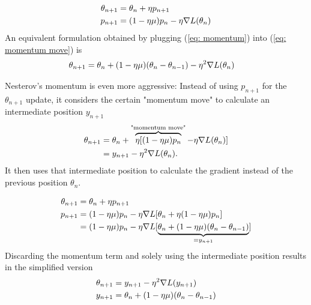\begin{definition}
	\begin{subequations}
	\begin{align}
		\theta_{n+1} &= \theta_n + \eta p_{n+1} \label{eq: momentum move}\\
		p_{n+1} &= (1-\eta\mu)p_n - \eta\nabla L(\theta_n)
		\label{eq: momentum}
	\end{align}
	\end{subequations}
	An equivalent formulation obtained by plugging (\ref{eq: momentum}) into
	(\ref{eq: momentum move}) is
	\begin{align}
		\theta_{n+1}
		&= \theta_n + (1-\eta\mu)(\theta_n - \theta_{n-1}) - \eta^2\nabla L(\theta_n)
	\end{align}
\end{definition}
%
Nesterov's momentum is even more aggressive: Instead of using \(p_{n+1}\) for
the \(\theta_{n+1}\) update, it considers the certain "momentum move"
to calculate an intermediate position \(y_{n+1}\)
%
\begin{align*}
	\theta_{n+1}
	&= \theta_n + \overbrace{\eta [(1-\eta\mu)p_n}^{\text{"momentum move"}}
	- \eta\nabla L(\theta_n)] \\
	&= y_{n+1} - \eta^2 \nabla L(\theta_n).
\end{align*}
%
It then uses that intermediate position to calculate the gradient instead of the
previous position \(\theta_n\).
%
\begin{definition}
	\begin{subequations}
	\begin{align}
		\theta_{n+1} &= \theta_n + \eta p_{n+1} \label{eq: nesterov momentum move}\\
		p_{n+1}
		&= (1-\eta\mu)p_n
		- \eta\nabla L[\theta_n + \eta(1-\eta\mu)p_n]
		\label{eq: nesterov momentum}
		\\ \nonumber
		&= (1-\eta\mu)p_n
		- \eta\nabla L[\underbrace{
			\theta_n + (1-\eta\mu)(\theta_n - \theta_{n-1})
		}_{= y_{n+1}}]
	\end{align}
	\end{subequations}
	Discarding the momentum term and solely using the intermediate position
	results in the simplified version
	\begin{subequations} \label{eq: nesterov intermediate position version}
	\begin{align}
		\theta_{n+1} &= y_{n+1} - \eta^2 \nabla L(y_{n+1})\\
		y_{n+1}&= \theta_n + (1-\eta\mu)(\theta_n - \theta_{n-1})
	\end{align}
	\end{subequations}
\end{definition}
